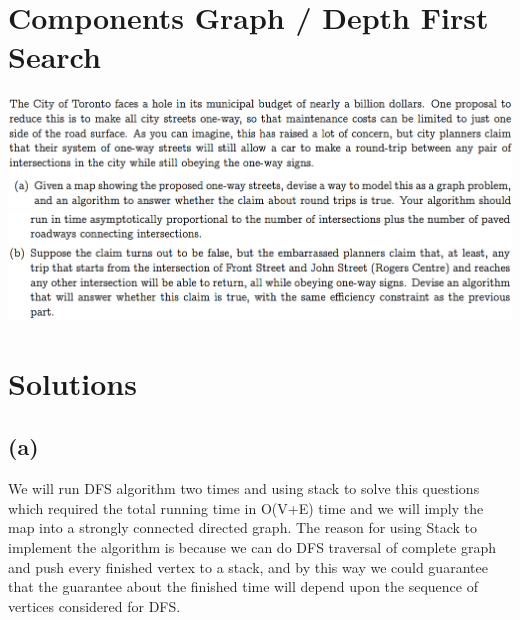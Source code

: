 \documentclass{article}
\begin{document}
\section*{Components Graph / Depth First Search}
\includegraphics[width=\textwidth]{Components Graph1}
\includegraphics[width=\textwidth]{Components Graph2}
\section*{Solutions}
\subsection*{(a)} 
We will run DFS algorithm two times and using stack to solve this questions which required the total running time in O(V+E) time and we will imply the map into a strongly connected directed graph. The reason for using Stack to implement the algorithm is because we can do DFS traversal of complete graph and push every finished vertex to a stack, and by this way we could guarantee that the guarantee about the finished time will depend upon the sequence of vertices considered for DFS.\\

\end{document}
